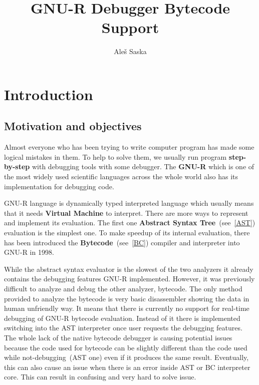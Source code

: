 \documentclass[thesis=M,english]{FITthesis}[2018/10/20]
\title{GNU-R Debugger Bytecode Support}
\author{Ale{\v s} Saska} %
\begin{document}


\chapter{Introduction}\label{introduction}

\section{Motivation and objectives}\label{motivation-and-objectives}

Almost everyone who has been trying to write computer program has made some logical mistakes in them. To help to solve them, we usually run program \textbf{step-by-step} with debugging tools with some debugger. The \mbox{\textbf{GNU-R}} which is one of the most widely used scientific languages across the whole world also has its implementation for debugging code.

GNU-R language is dynamically typed interpreted language which usually means that it needs \textbf{Virtual Machine} to interpret. There are more ways to represent and implement its evaluation. The first one \textbf{Abstract Syntax Tree}~(see~\ref{AST}) evaluation is the simplest one. To make speedup of its internal evaluation, there has been introduced the \textbf{Bytecode}~(see~\ref{BC}) compiler and interpreter into \mbox{GNU-R} in 1998.

While the abstract syntax evaluator is the slowest of the two analyzers it already contains the debugging features GNU-R implemented. However, it was previously difficult to analyze and debug the other analyzer, bytecode. The only method provided to analyze the bytecode is very basic disassembler showing the data in human unfriendly way. It means that there is currently no support for real-time debugging of GNU-R bytecode evaluation. Instead of it there is implemented switching into the AST interpreter once user requests the debugging features. The whole lack of the native bytecode debugger is causing potential issues because the code used for bytecode can be slightly different than the code used while not-debugging~(AST one) even if it produces the same result. Eventually, this can also cause an issue when there is an error inside AST or BC interpreter core. This can result in confusing and very hard to solve issue.
\end{document}
